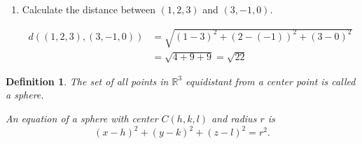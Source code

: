 \documentclass[12pt]{exam}
\newtheorem*{definition}{Definition}
\begin{document}
  \begin{enumerate}
    \item{
      Calculate the distance between $(1,2,3)$ and $(3,-1,0)$.
      \begin{solution}
        \begin{align*}
          d\left((1,2,3),(3,-1,0)\right) & = \sqrt{(1-3)^2+(2-(-1))^2+(3-0)^2}\\
            & = \sqrt{4+9+9} = \sqrt{22}
        \end{align*}
      \end{solution}
    }
  \end{enumerate}
  
  \begin{definition}
    The set of all points in $\mathbb{R}^{3}$ equidistant from a center point is called a sphere.
    
    An equation of a sphere with center $C(h,k,l)$ and radius $r$ is
    \[
      (x-h)^{2}+(y-k)^{2}+(z-l)^{2}=r^{2}.
    \]
  \end{definition}
  
\end{document}
